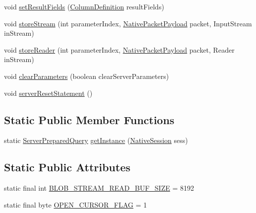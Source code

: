 \begin{DoxyCompactItemize}
\item 
void \mbox{\hyperlink{classcom_1_1mysql_1_1cj_1_1_server_prepared_query_a6da093a11acf01d2d44e7c248b89de57}{set\+Result\+Fields}} (\mbox{\hyperlink{interfacecom_1_1mysql_1_1cj_1_1protocol_1_1_column_definition}{Column\+Definition}} result\+Fields)
\item 
void \mbox{\hyperlink{classcom_1_1mysql_1_1cj_1_1_server_prepared_query_a056104958d556f856c15308012eae077}{store\+Stream}} (int parameter\+Index, \mbox{\hyperlink{classcom_1_1mysql_1_1cj_1_1protocol_1_1a_1_1_native_packet_payload}{Native\+Packet\+Payload}} packet, Input\+Stream in\+Stream)
\item 
void \mbox{\hyperlink{classcom_1_1mysql_1_1cj_1_1_server_prepared_query_ac4ac18fbd9ce15ea67cb5bb4a04bf420}{store\+Reader}} (int parameter\+Index, \mbox{\hyperlink{classcom_1_1mysql_1_1cj_1_1protocol_1_1a_1_1_native_packet_payload}{Native\+Packet\+Payload}} packet, Reader in\+Stream)
\item 
void \mbox{\hyperlink{classcom_1_1mysql_1_1cj_1_1_server_prepared_query_aa5d47640d47bde9fff14feaaf1ad2bf1}{clear\+Parameters}} (boolean clear\+Server\+Parameters)
\item 
void \mbox{\hyperlink{classcom_1_1mysql_1_1cj_1_1_server_prepared_query_ac8db9431d10351f9ad35cac48cb57a5b}{server\+Reset\+Statement}} ()
\end{DoxyCompactItemize}
\subsection*{Static Public Member Functions}
\begin{DoxyCompactItemize}
\item 
static \mbox{\hyperlink{classcom_1_1mysql_1_1cj_1_1_server_prepared_query}{Server\+Prepared\+Query}} \mbox{\hyperlink{classcom_1_1mysql_1_1cj_1_1_server_prepared_query_ac255ccf3f9e59cd9b6fcbdbaed9dc5f9}{get\+Instance}} (\mbox{\hyperlink{classcom_1_1mysql_1_1cj_1_1_native_session}{Native\+Session}} sess)
\end{DoxyCompactItemize}
\subsection*{Static Public Attributes}
\begin{DoxyCompactItemize}
\item 
static final int \mbox{\hyperlink{classcom_1_1mysql_1_1cj_1_1_server_prepared_query_a31968a0571fd7a5b77a7353ab2458eeb}{B\+L\+O\+B\+\_\+\+S\+T\+R\+E\+A\+M\+\_\+\+R\+E\+A\+D\+\_\+\+B\+U\+F\+\_\+\+S\+I\+ZE}} = 8192
\item 
static final byte \mbox{\hyperlink{classcom_1_1mysql_1_1cj_1_1_server_prepared_query_a6578a6a2b278767240b8d382dc355928}{O\+P\+E\+N\+\_\+\+C\+U\+R\+S\+O\+R\+\_\+\+F\+L\+AG}} = 1
\end{DoxyCompactItemize}
